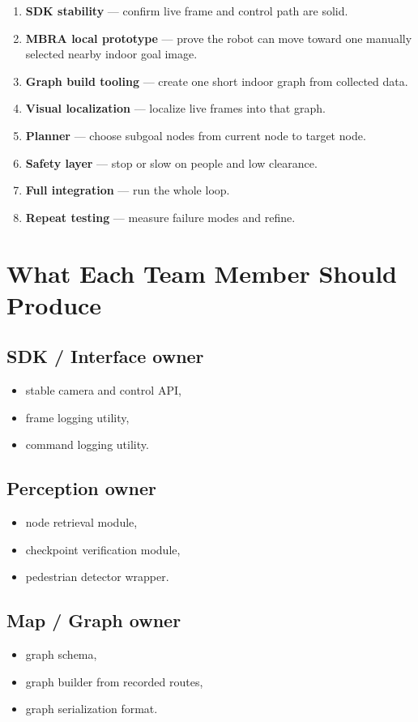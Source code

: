 \documentclass[11pt,a4paper]{article}
\begin{document}
\begin{enumerate}
  \item \textbf{SDK stability} --- confirm live frame and control path are solid.
  \item \textbf{MBRA local prototype} --- prove the robot can move toward one manually selected nearby indoor goal image.
  \item \textbf{Graph build tooling} --- create one short indoor graph from collected data.
  \item \textbf{Visual localization} --- localize live frames into that graph.
  \item \textbf{Planner} --- choose subgoal nodes from current node to target node.
  \item \textbf{Safety layer} --- stop or slow on people and low clearance.
  \item \textbf{Full integration} --- run the whole loop.
  \item \textbf{Repeat testing} --- measure failure modes and refine.
\end{enumerate}


\section{What Each Team Member Should Produce}

\subsection*{SDK / Interface owner}
\begin{itemize}[nosep]
  \item stable camera and control API,
  \item frame logging utility,
  \item command logging utility.
\end{itemize}

\subsection*{Perception owner}
\begin{itemize}[nosep]
  \item node retrieval module,
  \item checkpoint verification module,
  \item pedestrian detector wrapper.
\end{itemize}

\subsection*{Map / Graph owner}
\begin{itemize}[nosep]
  \item graph schema,
  \item graph builder from recorded routes,
  \item graph serialization format.
\end{itemize}
\end{document}
